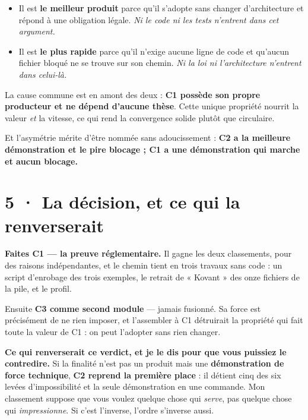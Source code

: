 \documentclass[10pt]{article}
\begin{document}
\begin{itemize}[leftmargin=1.2em,itemsep=2pt,topsep=2pt]
\item Il est \textbf{le meilleur produit} parce qu'il s'adopte sans changer d'architecture et répond à
      une obligation légale. \emph{Ni le code ni les tests n'entrent dans cet argument.}
\item Il est \textbf{le plus rapide} parce qu'il n'exige aucune ligne de code et qu'aucun fichier bloqué
      ne se trouve sur son chemin. \emph{Ni la loi ni l'architecture n'entrent dans celui-là.}
\end{itemize}

La cause commune est en amont des deux : \textbf{C1 possède son propre producteur et ne dépend d'aucune
thèse}. Cette unique propriété nourrit la valeur \emph{et} la vitesse, ce qui rend la convergence
solide plutôt que circulaire.

Et l'asymétrie mérite d'être nommée sans adoucissement : \textbf{C2 a la meilleure démonstration et le
pire blocage ; C1 a une démonstration qui marche et aucun blocage.}

\section{5 · La décision, et ce qui la renverserait}

\begin{acquis}
\textbf{Faites C1 --- la preuve réglementaire.} Il gagne les deux classements, pour des raisons
indépendantes, et le chemin tient en trois travaux sans code : un script d'enrobage des trois exemples,
le retrait de « Kovant » des onze fichiers de la pile, et le profil.
\end{acquis}

Ensuite \textbf{C3 comme second module} --- jamais fusionné. Sa force est précisément de ne rien imposer,
et l'assembler à C1 détruirait la propriété qui fait toute la valeur de C1 : on peut l'adopter sans rien
changer.

\begin{piste}
\textbf{Ce qui renverserait ce verdict, et je le dis pour que vous puissiez le contredire.} Si la
finalité n'est pas un produit mais une \textbf{démonstration de force technique}, \textbf{C2 reprend la
première place} : il détient cinq des six levées d'impossibilité et la seule démonstration en une
commande. Mon classement suppose que vous voulez quelque chose qui \emph{serve}, pas quelque chose qui
\emph{impressionne}. Si c'est l'inverse, l'ordre s'inverse aussi.
\end{piste}
\end{document}
